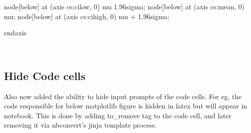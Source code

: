 \documentclass[float=false,crop=false]{standalone}
\begin{document}
\begin{InVerbatim}[commandchars=\\\{\},fontsize=\scriptsize]
            \PYZbs{}node[below] at (axis cs:\PYZbs{}cilow, 0)  \PYZob{}\PYZdl{}\PYZbs{}mu \PYZhy{} 1.96\PYZbs{}sigma\PYZdl{}\PYZcb{};
            \PYZbs{}node[below] at (axis cs:\PYZbs{}mean, 0)  \PYZob{}\PYZdl{}\PYZbs{}mu\PYZdl{}\PYZcb{};
            \PYZbs{}node[below] at (axis cs:\PYZbs{}cihigh, 0)  \PYZob{}\PYZdl{}\PYZbs{}mu + 1.96\PYZbs{}sigma\PYZdl{}\PYZcb{};
        
        \PYZbs{}end\PYZob{}axis\PYZcb{}
\end{InVerbatim}
    \begin{center}
    \end{center}
    { \hspace*{\fill} \\}
    
    \subsection{Hide Code cells}\label{hide-code-cells}

Also now added the ability to hide input prompts of the code cells. For
eg, the code responsible for below matplotlib figure is hidden in latex
but will appear in notebook. This is done by adding to\_remove tag to
the code cell, and later removing it via nbconvert's jinja template
process.
    \begin{center}
    \end{center}
    { \hspace*{\fill} \\}
    

    
    
    
    
\end{document}

